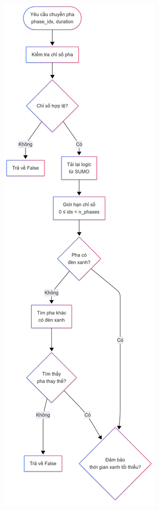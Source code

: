 \begin{figure}[htbp]
    \centering
    \begin{minipage}[t]{0.48\textwidth}
        \centering
        \includegraphics[width=0.9\linewidth]{Untitled diagram _ Mermaid Chart-2025-08-22-064822.png}

\end{minipage}
\end{figure}
